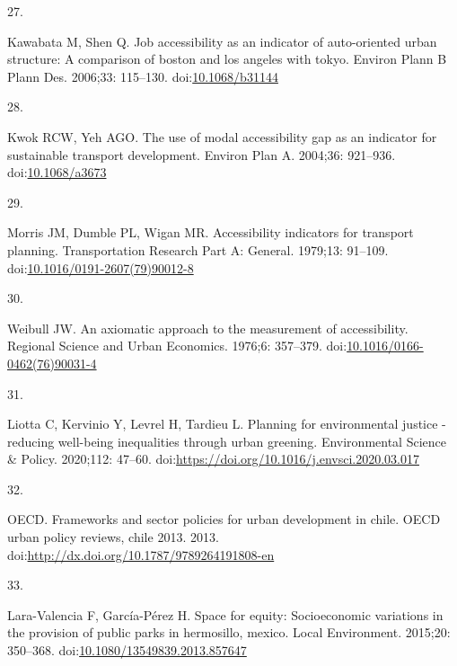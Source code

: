 \documentclass[10pt,letterpaper]{article}
\newlength{\cslhangindent}
\newlength{\csllabelwidth}
\newlength{\cslentryspacingunit} %
\newenvironment{CSLReferences}[2] %
 {%
  \setlength{\parindent}{0pt}
  \ifodd #1
  \let\oldpar\par
  \def\par{\hangindent=\cslhangindent\oldpar}
  \fi
  \setlength{\parskip}{#2\cslentryspacingunit}
 }%
 {}
\newcommand{\CSLLeftMargin}[1]{\parbox[t]{\csllabelwidth}{#1}}
\newcommand{\CSLRightInline}[1]{\parbox[t]{\linewidth - \csllabelwidth}{#1}\break}
\begin{document}
\begin{CSLReferences}{0}{0}
\leavevmode{}%
\CSLLeftMargin{27. }%
\CSLRightInline{Kawabata M, Shen Q. Job accessibility as an indicator of
auto-oriented urban structure: A comparison of boston and los angeles
with tokyo. Environ Plann B Plann Des. 2006;33: 115--130.
doi:\href{https://doi.org/10.1068/b31144}{10.1068/b31144}}

\leavevmode{}%
\CSLLeftMargin{28. }%
\CSLRightInline{Kwok RCW, Yeh AGO. The use of modal accessibility gap as
an indicator for sustainable transport development. Environ Plan A.
2004;36: 921--936.
doi:\href{https://doi.org/10.1068/a3673}{10.1068/a3673}}

\leavevmode{}%
\CSLLeftMargin{29. }%
\CSLRightInline{Morris JM, Dumble PL, Wigan MR. Accessibility indicators
for transport planning. Transportation Research Part A: General.
1979;13: 91--109.
doi:\href{https://doi.org/10.1016/0191-2607(79)90012-8}{10.1016/0191-2607(79)90012-8}}

\leavevmode{}%
\CSLLeftMargin{30. }%
\CSLRightInline{Weibull JW. An axiomatic approach to the measurement of
accessibility. Regional Science and Urban Economics. 1976;6: 357--379.
doi:\href{https://doi.org/10.1016/0166-0462(76)90031-4}{10.1016/0166-0462(76)90031-4}}

\leavevmode{}%
\CSLLeftMargin{31. }%
\CSLRightInline{Liotta C, Kervinio Y, Levrel H, Tardieu L. Planning for
environmental justice - reducing well-being inequalities through urban
greening. Environmental Science \& Policy. 2020;112: 47--60.
doi:\url{https://doi.org/10.1016/j.envsci.2020.03.017}}

\leavevmode{}%
\CSLLeftMargin{32. }%
\CSLRightInline{OECD. Frameworks and sector policies for urban
development in chile. OECD urban policy reviews, chile 2013. 2013.
doi:\url{http://dx.doi.org/10.1787/9789264191808-en}}

\leavevmode{}%
\CSLLeftMargin{33. }%
\CSLRightInline{Lara-Valencia F, García-Pérez H. Space for equity:
Socioeconomic variations in the provision of public parks in hermosillo,
mexico. Local Environment. 2015;20: 350--368.
doi:\href{https://doi.org/10.1080/13549839.2013.857647}{10.1080/13549839.2013.857647}}


\end{CSLReferences}
\end{document}
